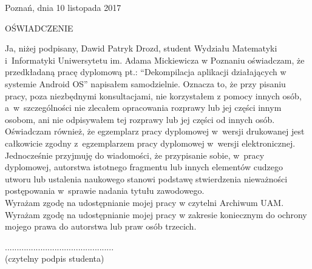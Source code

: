 \documentclass[12pt,a4paper,leqno,oneside,titlepage]{book}
\newcommand{\myAuthorName}{Dawid Patryk Drozd}
\begin{document}
\begin{flushright}{
Poznań, dnia 10 listopada 2017
}\end{flushright}
\begin{center}{
\par
\vspace{1.5cm plus 1.5fill}
{\large OŚWIADCZENIE}
}\end{center}
\par
\vspace{1.5cm plus 1.5fill}
Ja, niżej podpisany, \myAuthorName{}, student Wydziału Matematyki i~Informatyki Uniwersytetu im. Adama Mickiewicza w Poznaniu oświadczam, że przedkładaną pracę dyplomową pt.: ``Dekompilacja aplikacji działających w systemie Android OS'' napisałem samodzielnie. Oznacza to, że przy pisaniu pracy, poza niezbędnymi konsultacjami, nie korzystałem z pomocy innych osób, a~w~szczególności nie zlecałem opracowania rozprawy lub jej części innym osobom, ani nie odpisywałem tej rozprawy lub jej części od innych osób.\\

Oświadczam również, że egzemplarz pracy dyplomowej w~wersji drukowanej jest całkowicie zgodny z~egzemplarzem pracy dyplomowej w~wersji elektronicznej.\\

Jednocześnie przyjmuję do wiadomości, że przypisanie sobie, w~pracy dyplomowej, autorstwa istotnego fragmentu lub innych elementów cudzego utworu lub ustalenia naukowego stanowi podstawę  stwierdzenia  nieważności postępowania w~sprawie nadania tytułu zawodowego.\\

Wyrażam zgodę na udostępnianie mojej pracy w czytelni Archiwum UAM.\\

Wyrażam zgodę na udostępnianie mojej pracy w zakresie koniecznym do ochrony mojego prawa do autorstwa lub praw osób trzecich.
\par
\vspace{1.5cm plus 1.5fill}
\begin{center}{
..............................................\\
{\footnotesize(czytelny podpis studenta)}
}\end{center}


\end{document}

